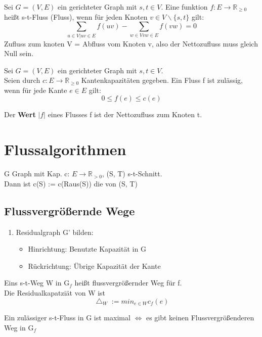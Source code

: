 \documentclass[14pt]{article}
\begin{document}
        \begin{definition}[Fluss]
            Sei $G = (V, E)$ ein gerichteter Graph mit $s, t \in V$. 
            Eine funktion $f : E \rightarrow \mathbb{R}_{\geq 0}$ heißt
            s-t-Fluss (Fluss), wenn für jeden Knoten $v \in V \backslash
            \{ s, t \}$ gilt: 
            \[
                \sum_{u \in V | uv \in E} f(uv) 
                - \sum_{w \in V vw \in E} f(vw) = 0
            \]
            Zufluss zum knoten V = Abfluss vom Knoten v, also der 
            Nettozufluss muss gleich Null sein.
        \end{definition}
        \begin{definition}
            Sei $G = (V, E)$ ein gerichteter Graph mit $s, t \in V$. \\
            Seien durch $c: E \rightarrow \mathbb{R}_{\geq 0}$ Kantenkapazitäten
            gegeben. Ein Fluss f ist zulässig, wenn für jede Kante $e \in E$ gilt:
            \[
                0 \leq f(e) \leq c(e)  
            \]
        \end{definition}
        Der \textbf{Wert} $|f|$ eines Flusses f ist der Nettozufluss 
        zum Knoten t.

    \section{Flussalgorithmen}
        \begin{definition}
            G Graph mit Kap. c: $E \rightarrow \mathbb{R}_{> 0}$, (S, T) s-t-Schnitt. \\
            Dann ist c(S) := c(Raus(S)) die  von (S, T)
        \end{definition}

        \subsection{Flussvergrößernde Wege}
            \begin{enumerate}
                \item Residualgraph G' bilden:
                \begin{itemize}
                    \item Hinrichtung: Benutzte Kapazität in G
                    \item Rückrichtung: Übrige Kapazität der Kante
                \end{itemize}
            \end{enumerate}
            \begin{definition}
                Eins s-t-Weg W in G$_f$ heißt flussvergrößernder Weg für f. \\
                Die Residualkapatziät von W ist 
                \[
                    \bigtriangleup_W  := min_{e \in W} c_f(e)  
                \]
            \end{definition}
            Ein zulässiger s-t-Fluss in G ist maximal $\Leftrightarrow$ es gibt 
            keinen Flussvergrößenderen Weg in G$_f$
        
\end{document}
